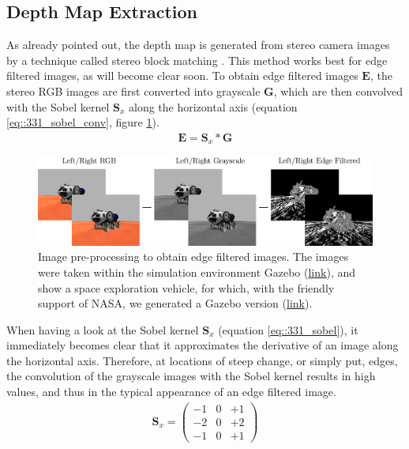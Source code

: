 \subsection{Depth Map Extraction}
As already pointed out, the depth map is generated from stereo camera images by a technique called stereo block matching \cite{hamzah2010sum}. This method works best for edge filtered images, as will become clear soon. To obtain edge filtered images $\bm{E}$, the stereo RGB images are first converted into grayscale $\bm{G}$, which are then convolved with the Sobel kernel $\bm{S}_x$ along the horizontal axis \cite{sobel2014an} (equation \ref{eq::331_sobel_conv}, figure \ref{fig::331_image_preprocessing}). 
\begin{align}
	\bm{E} = \bm{S}_x*\bm{G}
	\label{eq::331_sobel_conv}
\end{align}
\begin{figure}[h!]
	\centering
	\includegraphics[scale=.28]{chapters/03_principles_of_machine_learning/img/image_preprocessing.png}
	\caption{Image pre-processing to obtain edge filtered images. The images were taken within the simulation environment Gazebo (\href{http://gazebosim.org/}{\underline{link}}), and show a space exploration vehicle, for which, with the friendly support of NASA, we generated a Gazebo version (\href{https://github.com/mhubii/gazebo_models}{\underline{link}}).}
	\label{fig::331_image_preprocessing}
\end{figure}
When having a look at the Sobel kernel $\bm{S}_x$ (equation \ref{eq::331_sobel}), it immediately becomes clear that it approximates the derivative of an image along the horizontal axis. Therefore, at locations of steep change, or simply put, edges, the convolution of the grayscale images with the Sobel kernel results in high values, and thus in the typical appearance of an edge filtered image.
\begin{align}
	\bm{S}_x=
	\begin{pmatrix}
		-1 & 0 & +1 \\
		-2 & 0 & +2 \\
		-1 & 0 & +1
	\end{pmatrix}
	\label{eq::331_sobel}
\end{align}
